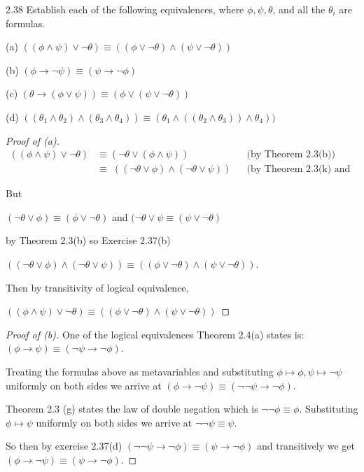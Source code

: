 \documentclass{article}
\theoremstyle{remark}\newtheorem{remark}{Remark}
\theoremstyle{plain}
\begin{document}
2.38 Establish each of the following equivalences, where $\phi, \psi, \theta$, and all the $\theta_i$ are formulas.

(a) $((\phi \land \psi) \lor \neg\theta) \equiv ((\phi \lor \neg\theta) \land (\psi \lor \neg\theta))$

(b) $(\phi \to \neg\psi) \equiv (\psi \to \neg\phi)$

(c) $(\theta \to (\phi \lor \psi)) \equiv (\phi \lor (\psi \lor \neg\theta))$

(d) $((\theta_1 \land \theta_2) \land (\theta_3 \land \theta_4)) \equiv (\theta_1 \land ((\theta_2 \land \theta_3)) \land \theta_4))$

\begin{proof}[Proof of (a)]
    \begin{align*}
        ((\phi \land \psi) \lor \neg\theta)
            &\equiv (\neg\theta \lor (\phi \land \psi)) && \text{(by Theorem 2.3(b))}\\
        &\equiv \; ((\neg\theta \lor \phi) \land (\neg\theta \lor \psi)) && \text{(by Theorem 2.3(k) and transitivity)}
    \end{align*}
    
    But

    $(\neg\theta \lor \phi) \equiv (\phi \lor \neg\theta)$ and $(\neg\theta \lor \psi \equiv (\psi \lor \neg\theta)$

    by Theorem 2.3(b) so Exercise 2.37(b)

    $((\neg\theta \lor \phi) \land (\neg\theta \lor \psi)) \equiv ((\phi \lor \neg\theta) \land (\psi \lor \neg\theta))$.

    Then by transitivity of logical equivalence,

    $((\phi \land \psi) \lor \neg\theta) \equiv ((\phi \lor \neg\theta) \land (\psi \lor \neg\theta))$
    
    
\end{proof}


\begin{proof}[Proof of (b)]
    One of the logical equivalences Theorem 2.4(a) states is: $(\phi \to \psi) \equiv (\neg\psi \to \neg\phi)$.

    Treating the formulas above as metavariables and substituting $\phi \mapsto \phi, \psi \mapsto \neg\psi$ uniformly on both sides we arrive at
    $(\phi \to \neg\psi) \equiv (\neg\neg\psi \to \neg\phi)$.

    Theorem 2.3 (g) states the law of double negation which is $\neg\neg\phi \equiv \phi$. Substituting $\phi \mapsto \psi$ uniformly on both sides we arrive at $\neg\neg\psi \equiv \psi$.

    So then by exercise 2.37(d) $(\neg\neg\psi \to \neg\phi) \equiv (\psi \to \neg\phi)$ and transitively we get $(\phi \to \neg\psi) \equiv (\psi \to \neg\phi)$.
\end{proof}
\end{document}
